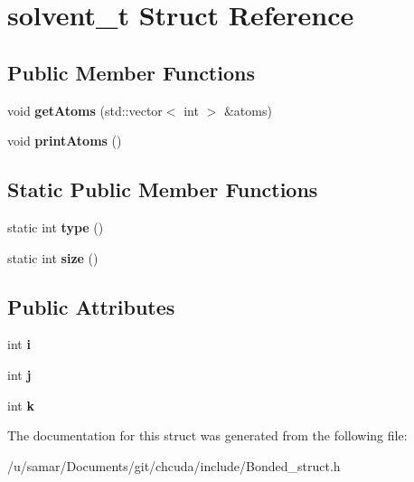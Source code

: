 \hypertarget{structsolvent__t}{}\section{solvent\+\_\+t Struct Reference}
\label{structsolvent__t}
\subsection*{Public Member Functions}
\begin{DoxyCompactItemize}
\item 
\hypertarget{structsolvent__t_abb12339e961b188e294d6a209519914a}{}\label{structsolvent__t_abb12339e961b188e294d6a209519914a} 
void {\bfseries get\+Atoms} (std\+::vector$<$ int $>$ \&atoms)
\item 
\hypertarget{structsolvent__t_acb88ad579fe69328d85c98c1580e4ac9}{}\label{structsolvent__t_acb88ad579fe69328d85c98c1580e4ac9} 
void {\bfseries print\+Atoms} ()
\end{DoxyCompactItemize}
\subsection*{Static Public Member Functions}
\begin{DoxyCompactItemize}
\item 
\hypertarget{structsolvent__t_ab9c4a3d933fc7bf8e3698537017e1a65}{}\label{structsolvent__t_ab9c4a3d933fc7bf8e3698537017e1a65} 
static int {\bfseries type} ()
\item 
\hypertarget{structsolvent__t_ad7c3bb92e9feb6fb74bea84300bb6027}{}\label{structsolvent__t_ad7c3bb92e9feb6fb74bea84300bb6027} 
static int {\bfseries size} ()
\end{DoxyCompactItemize}
\subsection*{Public Attributes}
\begin{DoxyCompactItemize}
\item 
\hypertarget{structsolvent__t_a39316277b1789a8c31526b171f2cd451}{}\label{structsolvent__t_a39316277b1789a8c31526b171f2cd451} 
int {\bfseries i}
\item 
\hypertarget{structsolvent__t_aedb4a6a1e76573817c726b80d8c4c006}{}\label{structsolvent__t_aedb4a6a1e76573817c726b80d8c4c006} 
int {\bfseries j}
\item 
\hypertarget{structsolvent__t_a2aee343736906059dd2959a335084ed3}{}\label{structsolvent__t_a2aee343736906059dd2959a335084ed3} 
int {\bfseries k}
\end{DoxyCompactItemize}


The documentation for this struct was generated from the following file\+:\begin{DoxyCompactItemize}
\item 
/u/samar/\+Documents/git/chcuda/include/Bonded\+\_\+struct.\+h\end{DoxyCompactItemize}
